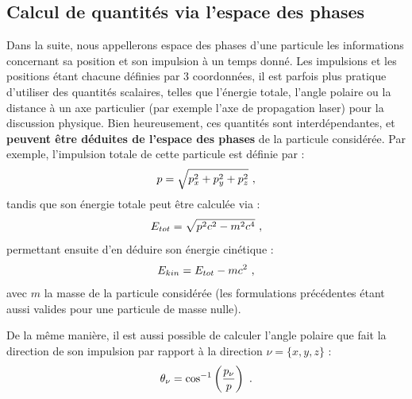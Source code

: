 \begin{refsection}
\subsection{Calcul de quantités via l'espace des phases}

Dans la suite, nous appellerons espace des phases d'une particule les informations concernant sa position et son impulsion à un temps donné. Les impulsions et les positions étant chacune définies par 3 coordonnées, il est parfois plus pratique d'utiliser des quantités scalaires, telles que l'énergie totale, l'angle polaire ou la distance à un axe particulier (par exemple l'axe de propagation laser) pour la discussion physique. Bien heureusement, ces quantités sont interdépendantes, et \textbf{peuvent être déduites de l'espace des phases} de la particule considérée. Par exemple, l'impulsion totale de cette particule est définie par :
\begin{equation}
    p = \sqrt{p_x^2 + p_y^2 + p_z^2} ~ \rm ,
\end{equation}
tandis que son énergie totale peut être calculée via :
\begin{equation}
    E_{tot} = \sqrt{p^2 c^2 - m^2 c^4} ~ \rm ,
\end{equation}
permettant ensuite d'en déduire son énergie cinétique :
\begin{equation}
    E_{kin} = E_{tot} - m c^2 ~ \rm ,
\end{equation}
avec $m$ la masse de la particule considérée (les formulations précédentes étant aussi valides pour une particule de masse nulle).

De la même manière, il est aussi possible de calculer l'angle polaire que fait la direction de son impulsion par rapport à la direction $\nu = \{x, y, z\}$ :
\begin{equation}
    \theta_\nu = \cos^{-1} \left(\dfrac{p_\nu}{p}\right) ~ \rm .
\end{equation}


\end{refsection}
